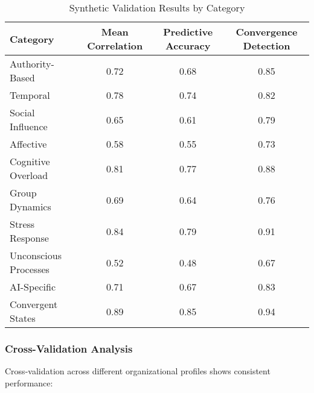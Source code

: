 \documentclass[11pt, onecolumn]{article}
\begin{document}
\begin{table}[h!]
\centering
\caption{Synthetic Validation Results by Category}
\begin{tabular}{lccc}
\toprule
Category & Mean Correlation & Predictive Accuracy & Convergence Detection \\
\midrule
Authority-Based & 0.72 & 0.68 & 0.85 \\
Temporal & 0.78 & 0.74 & 0.82 \\
Social Influence & 0.65 & 0.61 & 0.79 \\
Affective & 0.58 & 0.55 & 0.73 \\
Cognitive Overload & 0.81 & 0.77 & 0.88 \\
Group Dynamics & 0.69 & 0.64 & 0.76 \\
Stress Response & 0.84 & 0.79 & 0.91 \\
Unconscious Processes & 0.52 & 0.48 & 0.67 \\
AI-Specific & 0.71 & 0.67 & 0.83 \\
Convergent States & 0.89 & 0.85 & 0.94 \\
\bottomrule
\end{tabular}
\end{table}

\subsubsection{Cross-Validation Analysis}

Cross-validation across different organizational profiles shows consistent performance:
\end{document}
